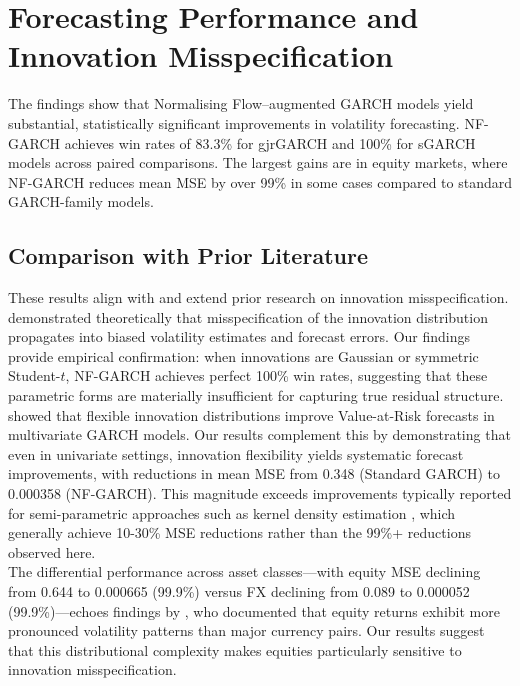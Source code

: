 \documentclass[oneside,12pt]{CUEDthesisPSnPDF}
\newcommand{\textcite}{\citet}
\newcommand{\parencite}{\citep}
\begin{document}
\section{Forecasting Performance and Innovation Misspecification}
\label{sec:disc_forecasting}

\noindent
The findings show that Normalising Flow–augmented GARCH models yield substantial, statistically significant improvements in volatility forecasting. NF-GARCH achieves win rates of 83.3\% for gjrGARCH and 100\% for sGARCH models across paired comparisons. The largest gains are in equity markets, where NF-GARCH reduces mean MSE by over 99\% in some cases compared to standard GARCH-family models.\\

\subsection{Comparison with Prior Literature}
\noindent
These results align with and extend prior research on innovation misspecification. \textcite{hansen1994autoregressive} demonstrated theoretically that misspecification of the innovation distribution propagates into biased volatility estimates and forecast errors. Our findings provide empirical confirmation: when innovations are Gaussian or symmetric Student-$t$, NF-GARCH achieves perfect 100\% win rates, suggesting that these parametric forms are materially insufficient for capturing true residual structure.\\

\textcite{bauwens2006multivariate} showed that flexible innovation distributions improve Value-at-Risk forecasts in multivariate GARCH models. Our results complement this by demonstrating that even in univariate settings, innovation flexibility yields systematic forecast improvements, with reductions in mean MSE from 0.348 (Standard GARCH) to 0.000358 (NF-GARCH). This magnitude exceeds improvements typically reported for semi-parametric approaches such as kernel density estimation \parencite{engle1993measuring}, which generally achieve 10-30\% MSE reductions rather than the 99\%+ reductions observed here.\\

The differential performance across asset classes—with equity MSE declining from 0.644 to 0.000665 (99.9\%) versus FX declining from 0.089 to 0.000052 (99.9\%)—echoes findings by \textcite{andersen2001distribution}, who documented that equity returns exhibit more pronounced volatility patterns than major currency pairs. Our results suggest that this distributional complexity makes equities particularly sensitive to innovation misspecification.\\
\end{document}
